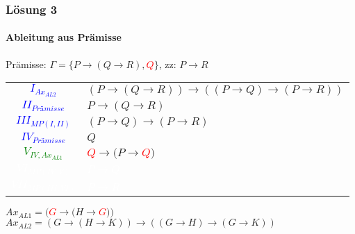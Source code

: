 \begin{frame}
	\frametitle{Lösung 3}
	\framesubtitle{Ableitung aus Prämisse}
	Prämisse: $\Gamma =\{P\rightarrow(Q\rightarrow R), $\textcolor{red}{$Q$}$\}$, zz: $P\rightarrow R$\\
	\begin{tabular}{cl}
		\textcolor{blue}{$I_{Ax_{AL2}}$}       & $(P\rightarrow(Q\rightarrow R))\rightarrow((P\rightarrow Q)\rightarrow(P\rightarrow R))$ \\
		\textcolor{blue}{$II_{Prämisse}$}      & $P\rightarrow(Q\rightarrow R)$                                                           \\
		\textcolor{blue}{$III_{MP(I, II)}$}    & $(P\rightarrow Q)\rightarrow(P\rightarrow R)$                                            \\
		\textcolor{blue}{$IV_{Prämisse}$}      & $Q$                                                                                      \\
		\textcolor{green}{$V_{IV, Ax_{AL1}}$}  & \textcolor{red}{$Q$}$\rightarrow(P\rightarrow $\textcolor{red}{$Q$}$)$                   \\
		\textcolor{white}{$VI_{MP(IV, V)}$}    & \textcolor{white}{$P\rightarrow Q$}                                                      \\
		\textcolor{white}{$VII_{MP(III, VI)}$} & \textcolor{white}{$P\rightarrow R$}                                                      \\
	\end{tabular}
	$Ax_{AL1} = ($\textcolor{red}{$G$}$\rightarrow(H\rightarrow $\textcolor{red}{$G$}$))$\\
	$Ax_{AL2} = (G\rightarrow(H\rightarrow K))\rightarrow((G\rightarrow H)\rightarrow(G\rightarrow K))$\\
\end{frame}
